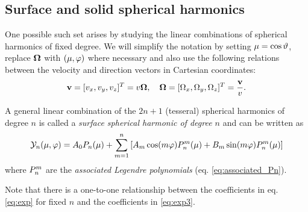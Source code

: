 \subsection{Surface and solid spherical harmonics}
One possible such set arises by studying the linear combinations of spherical harmonics of fixed degree. We will
simplify the notation by setting $\mu = \cost$, replace $\bomega$ with $(\mu, \azimuthal)$ where necessary and also use the
following relations between the velocity and direction vectors in Cartesian coordinates:
$$
  \bv = [v_x, v_y, v_z]^T = v\bomega,\quad \bomega = [\Omega_x, \Omega_y, \Omega_z]^T = \frac{\bv}{v}.
$$
\begin{definition}\label{defn:SSH}\cite[Def. 3.22]{Schreiner}
  A general linear combination of the $2n + 1$ (tesseral) spherical harmonics of degree $n$ is called a \textit{surface spherical 
  harmonic of degree $n$} and can be written as
  \begin{equation}\label{eq:exp3}
    \mathcal{Y}_n(\mu,\azimuthal) = A_0 P_n(\mu) + \suma[m]{1}{n}\left[ A_m \cos(m\azimuthal)\P{n}{m}(\mu) + B_m
    \sin(m\azimuthal)\P{n}{m}(\mu)\right]
  \end{equation}
  where $\P{n}{m}$ are the \textit{associated Legendre polynomials} (eq. \eqref{eq:associated_Pn}). 
\end{definition}
Note that there is a one-to-one relationship between the coefficients in eq. \eqref{eq:exp} for fixed $n$ and the 
coefficients in \eqref{eq:exp3}.

